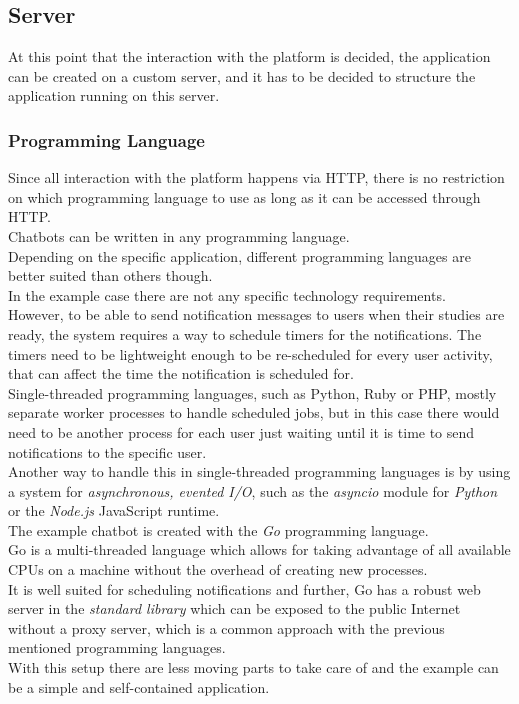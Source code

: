 \subsection{Server}

At this point that the interaction with the platform is decided, the application can be created on a custom server,
and it has to be decided to structure the application running on this server.


\subsubsection{Programming Language}

Since all interaction with the platform happens via HTTP,
there is no restriction on which programming language to use as long as it can be accessed through HTTP.
\\
Chatbots can be written in any programming language.
\\
Depending on the specific application, different programming languages are better suited than others though.
\\

In the example case there are not any specific technology requirements.
\\
However, to be able to send notification messages to users when their studies are ready,
the system requires a way to schedule timers for the notifications.
The timers need to be lightweight enough to be re-scheduled for every user activity,
that can affect the time the notification is scheduled for.
\\
Single-threaded programming languages, such as Python, Ruby or PHP,
mostly separate worker processes to handle scheduled jobs,
but in this case there would need to be another process for each user
just waiting until it is time to send notifications to the specific user.
\\
Another way to handle this in single-threaded programming languages is by using a system for \emph{asynchronous, evented I/O},
such as the \emph{asyncio} module for \emph{Python}\cite{asyncio} or the \emph{Node.js} JavaScript runtime\cite{nodejs}.
\\

The example chatbot is created with the \emph{Go} programming language\cite{golang}.
\\
Go is a multi-threaded language which allows for taking advantage of all available CPUs
on a machine without the overhead of creating new processes.
\\
It is well suited for scheduling notifications and further, Go has a robust web server in the \emph{standard library} which can be exposed to the public Internet without a proxy server, which is a common approach with the previous mentioned programming languages.
\\
With this setup there are less moving parts to take care of and the example can be a simple and self-contained application.
\\


